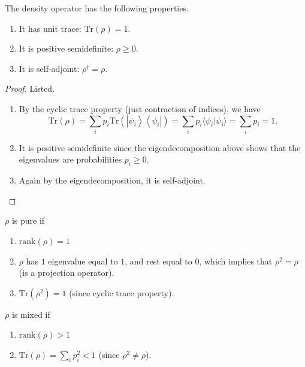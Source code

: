 \documentclass{article}
\newcommand{\ket}[1]{\ensuremath{\left|#1\right\rangle}}
\newcommand{\bra}[1]{\ensuremath{\left\langle#1\right|}}
\begin{document}
    \begin{theorem}
      The density operator has the following properties. 
      \begin{enumerate}
        \item It has unit trace: $\text{Tr}(\rho) = 1$.
        \item It is positive semidefinite: $\rho \geq 0$.
        \item It is self-adjoint: $\rho^\dagger = \rho$.
      \end{enumerate}
    \end{theorem}
    \begin{proof} 
      Listed. 
      \begin{enumerate} 
        \item By the cyclic trace property (just contraction of indices), we have 
          \begin{equation} 
            \text{Tr}(\rho) = \sum_i p_i \text{Tr}(\ket{\psi_i} \bra{\psi_i}) = \sum_i p_i \langle \psi_i | \psi_i \rangle = \sum_i p_i = 1.
          \end{equation}
        \item It is positive semidefinite since the eigendecomposition above shows that the eigenvalues are probabilities $p_i \geq 0$. 
        \item Again by the eigendecomposition, it is self-adjoint. 
      \end{enumerate}
    \end{proof}

    \begin{theorem}
      $\rho$ is pure if 
      \begin{enumerate} 
        \item $\mathrm{rank}(\rho) = 1$ 
        \item $\rho$ has $1$ eigenvalue equal to $1$, and rest equal to $0$, which implies that $\rho^2 = \rho$ (is a projection operator).
        \item $\mathrm{Tr}(\rho^2) = 1$ (since cyclic trace property). 
      \end{enumerate}

      $\rho$ is mixed if 
      \begin{enumerate} 
        \item $\mathrm{rank}(\rho) > 1$
        \item $\mathrm{Tr}(\rho) = \sum_i p_i^2 < 1$ (since $\rho^2 \neq \rho$).
      \end{enumerate}
    \end{theorem}
\end{document}
